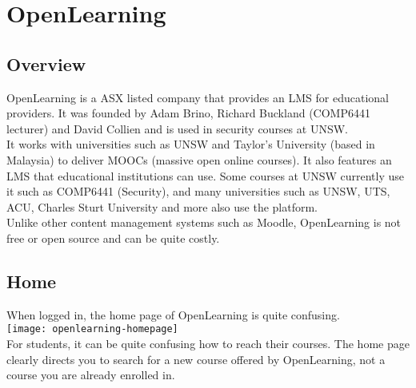
\section{OpenLearning}
\subsection{Overview}
OpenLearning is a ASX listed company that provides an LMS for educational providers. It was founded by Adam Brino, Richard Buckland (COMP6441 lecturer) and David Collien and is used in security courses at UNSW.\\
It works with universities such as UNSW and Taylor's University (based in Malaysia) to deliver MOOCs (massive open online courses). It also features an LMS that educational institutions can use. Some courses at UNSW currently use it such as COMP6441 (Security), and many universities such as UNSW, UTS, ACU, Charles Sturt University and more also use the platform.\\
Unlike other content management systems such as Moodle, OpenLearning is not free or open source and can be quite costly.\\

\subsection{Home}
When logged in, the home page of OpenLearning is quite confusing.\\
\texttt{[image: openlearning-homepage]} \\
For students, it can be quite confusing how to reach their courses. The home page clearly directs you to search for a new course offered by OpenLearning, not a course you are already enrolled in. \\

